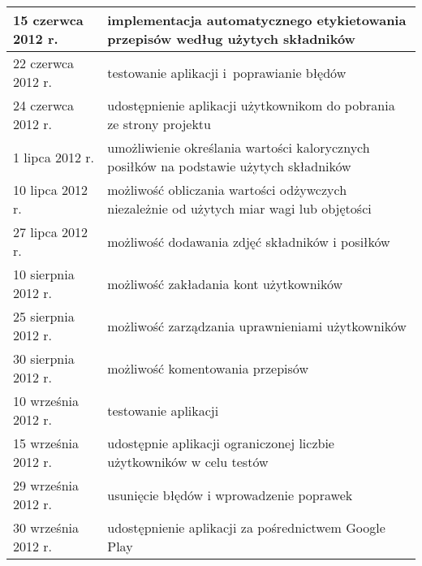 \documentclass[12pt,leqno, twoside]{mwart}
\begin{document}
\begin{table}
\begin{tabular}{|p{4cm}|p{11cm}|}
		15 czerwca 2012 r. & implementacja automatycznego etykietowania przepisów według użytych składników \\ \hline
		
		22 czerwca 2012 r. & testowanie aplikacji i~poprawianie błędów \\ \hline
		
		24 czerwca 2012 r. & udostępnienie aplikacji użytkownikom do pobrania ze strony projektu \\ \hline
		
		1 lipca 2012 r. & umożliwienie określania wartości kalorycznych posiłków na podstawie użytych składników \\ \hline

		10 lipca 2012 r. & możliwość obliczania wartości odżywczych niezależnie od użytych miar wagi lub objętości \\ \hline
		
		27 lipca 2012 r. & możliwość dodawania zdjęć składników i posiłków \\ \hline
		
		10 sierpnia 2012 r. & możliwość zakładania kont użytkowników \\ \hline
		
		25 sierpnia 2012 r. & możliwość zarządzania uprawnieniami użytkowników \\ \hline
		
		30 sierpnia 2012 r. & możliwość komentowania przepisów \\ \hline
		
		10 września 2012 r. & testowanie aplikacji \\ \hline
		
		15 września 2012 r. & udostępnie aplikacji ograniczonej liczbie użytkowników w celu testów \\ \hline
		
		29 września 2012 r. & usunięcie błędów i wprowadzenie poprawek \\ \hline
		
		30 września 2012 r. & udostępnienie aplikacji za pośrednictwem Google Play\\ \hline
		
		
		\end{tabular}
\end{table}
\end{document}
